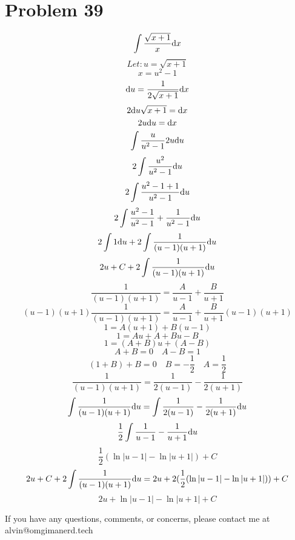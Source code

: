 \documentclass[letterpaper, 12pt]{math}
\begin{document}
\section*{Problem 39}
\[ \int{\frac{\sqrt{x+1}}{x}\mathrm{d}{x}} \]
\[ Let: u = \sqrt{x+1} \]
\[ x = u^{2}-1 \]
\[ \mathrm{d}{u} = \frac{1}{2\sqrt{x+1}}\mathrm{d}{x} \]
\[ 2\mathrm{d}{u}\sqrt{x+1} = \mathrm{d}{x} \]
\[ 2u\mathrm{d}{u} = \mathrm{d}{x} \]
\[ \int{\frac{u}{u^{2}-1}2u\mathrm{d}{u}} \]
\[ 2\int{\frac{u^{2}}{u^{2}-1}\mathrm{d}{u}} \]
\[ 2\int{\frac{u^{2}-1+1}{u^{2}-1}\mathrm{d}{u}} \]
\[ 2\int{\frac{u^{2}-1}{u^{2}-1}+\frac{1}{u^{2}-1}\mathrm{d}{u}} \]
\[ 2\int{1\mathrm{d}{u}}+2\int{\frac{1}{(u-1)(u+1)}\mathrm{d}{u}} \]
\[ 2u+C+2\int{\frac{1}{(u-1)(u+1)}\mathrm{d}{u}} \]
\[ \frac{1}{(u-1)(u+1)} = \frac{A}{u-1}+\frac{B}{u+1} \]
\[ (u-1)(u+1)\frac{1}{(u-1)(u+1)} = \frac{A}{u-1}+\frac{B}{u+1}(u-1)(u+1) \]
\[ 1 = A(u+1)+B(u-1) \]
\[ 1 = Au+A+Bu-B \]
\[ 1 = (A+B)u+(A-B) \]
\[ A+B = 0 \quad A-B = 1 \]
\[ (1+B)+B = 0 \quad B = -\frac{1}{2} \quad A = \frac{1}{2} \]
\[ \frac{1}{(u-1)(u+1)} = \frac{1}{2(u-1)}-\frac{1}{2(u+1)} \]
\[ \int{\frac{1}{(u-1)(u+1)}\mathrm{d}{u}} =
   \int{\frac{1}{2(u-1)}-\frac{1}{2(u+1)}\mathrm{d}{u}} \]
\[ \frac{1}{2}\int{\frac{1}{u-1}-\frac{1}{u+1}\mathrm{d}{u}} \]
\[ \frac{1}{2}(\ln|u-1|-\ln|u+1|)+C \]
\[ 2u+C+2\int{\frac{1}{(u-1)(u+1)}\mathrm{d}{u}} =
   2u+2(\frac{1}{2}(\ln|u-1|-\ln|u+1|))+C \]
\[ 2u+\ln|u-1|-\ln|u+1|+C \]

\begin{center}
  If you have any questions, comments, or concerns, please contact me at
  alvin@omgimanerd.tech
\end{center}
\end{document}
